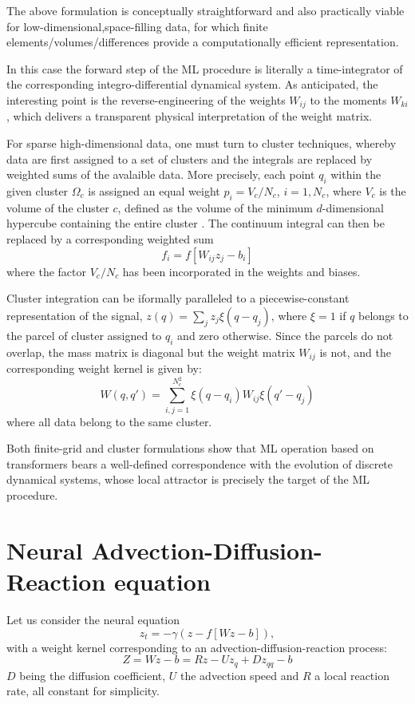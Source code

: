\documentclass[15pt]{article}
\begin{document}
The above formulation is conceptually straightforward and also practically viable
for low-dimensional,space-filling data, for which finite 
elements/volumes/differences provide a computationally efficient representation. 

In this case the forward step of the ML procedure is literally a 
time-integrator of the corresponding integro-differential dynamical system.
As anticipated, the interesting point is the reverse-engineering of the weights
$W_{ij}$ to the moments $W_{ki}$, which delivers a transparent 
physical interpretation of the weight matrix. 

For sparse high-dimensional data, one must turn to cluster techniques,
whereby data are first assigned to a set of clusters \cite{CLU} and the integrals
are replaced by weighted sums of the avalaible data.
More precisely, each point $q_i$ within the given cluster $\Omega_c$ is assigned an equal weight 
$p_i = V_c/N_c$, $i=1,N_c$, where $V_c$ is the volume of the cluster $c$, defined
as the volume of the minimum $d$-dimensional hypercube containing the entire cluster \cite{CLU}.    
The continuum integral can then be replaced by a corresponding weighted sum
$$
f_i =  f[W_{ij} z_j - b_i]
$$
where the factor $V_c/N_c$ has been incorporated in the weights and biases.
 
Cluster integration can be iformally paralleled to a piecewise-constant representation of
the signal, $z(q) = \sum_j z_j \xi(q-q_j)$, where $\xi=1$ if $q$ belongs to the
parcel of cluster assigned to $q_i$ and zero otherwise. 
Since the parcels do not overlap, the mass matrix is diagonal 
but the weight matrix $W_{ij}$ is not, and the corresponding weight 
kernel is given by:
\begin{equation}
\label{CMC}
W(q,q') = \sum_{i,j=1}^{N_c^2} \xi(q-q_i) W_{ij} \xi(q'-q_j)
\end{equation}
where all data belong to the same cluster.

Both finite-grid and cluster formulations show 
that ML operation based on transformers bears a well-defined correspondence
with the evolution of discrete dynamical systems, whose local attractor is
precisely the target of the ML procedure. 

\section{Neural Advection-Diffusion-Reaction equation}

Let us consider the neural equation
$$z_t = -\gamma(z-f[Wz-b]),$$
with a weight kernel corresponding to an advection-diffusion-reaction process:
$$
Z = Wz-b = R z - U z_q + D z_{qq}-b
$$
$D$ being the diffusion coefficient, $U$ the advection speed and $R$ a local
reaction rate, all constant for simplicity.
\end{document}
